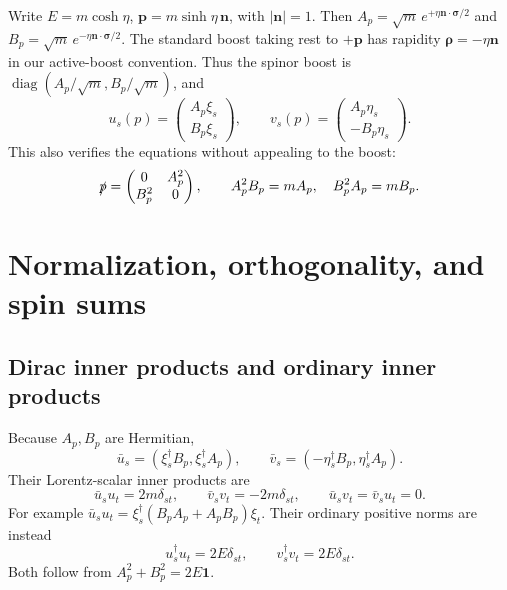 \documentclass[11pt]{article}
\newcommand{\one}{\mathbf 1}
\newcommand{\diag}{\operatorname{diag}}
\begin{document}
Write \(E=m\cosh\eta\), \(\bm p=m\sinh\eta\,\bm n\), with
\(|\bm n|=1\). Then
\(A_p=\sqrt m\,e^{+\eta\bm n\cdot\bm\sigma/2}\) and
\(B_p=\sqrt m\,e^{-\eta\bm n\cdot\bm\sigma/2}\).
The standard boost taking rest to \(+\bm p\) has rapidity
\(\bm\rho=-\eta\bm n\) in our active-boost convention. Thus the
spinor boost is \(\diag(A_p/\sqrt m,B_p/\sqrt m)\), and
\begin{equation}
 \boxed{u_s(p)=\begin{pmatrix}A_p\xi_s\\B_p\xi_s\end{pmatrix},
 \qquad v_s(p)=\begin{pmatrix}A_p\eta_s\\-B_p\eta_s\end{pmatrix}.}
 \label{eq:uv}
\end{equation}
This also verifies the equations without appealing to the boost:
\begin{equation}
 \slashed p=\begin{pmatrix}0&A_p^2\\B_p^2&0\end{pmatrix},
 \qquad A_p^2B_p=mA_p,\quad B_p^2A_p=mB_p.
 \label{eq:slashblocks}
\end{equation}

\section{Normalization, orthogonality, and spin sums}
\subsection{Dirac inner products and ordinary inner products}
Because \(A_p,B_p\) are Hermitian,
\begin{equation}
 \bar u_s=(\xi_s^\dagger B_p,\xi_s^\dagger A_p),\qquad
 \bar v_s=(-\eta_s^\dagger B_p,\eta_s^\dagger A_p).
 \label{eq:adjointsuv}
\end{equation}
Their Lorentz-scalar inner products are
\begin{equation}
 \bar u_su_t=2m\delta_{st},\qquad
 \bar v_sv_t=-2m\delta_{st},\qquad
 \bar u_sv_t=\bar v_su_t=0.
 \label{eq:uvbarnorm}
\end{equation}
For example \(\bar u_su_t=\xi_s^\dagger(B_pA_p+A_pB_p)\xi_t\).
Their ordinary positive norms are instead
\begin{equation}
 u_s^\dagger u_t=2E\delta_{st},\qquad
 v_s^\dagger v_t=2E\delta_{st}.
 \label{eq:uvdagnorm}
\end{equation}
Both follow from \(A_p^2+B_p^2=2E\one\).
\end{document}
